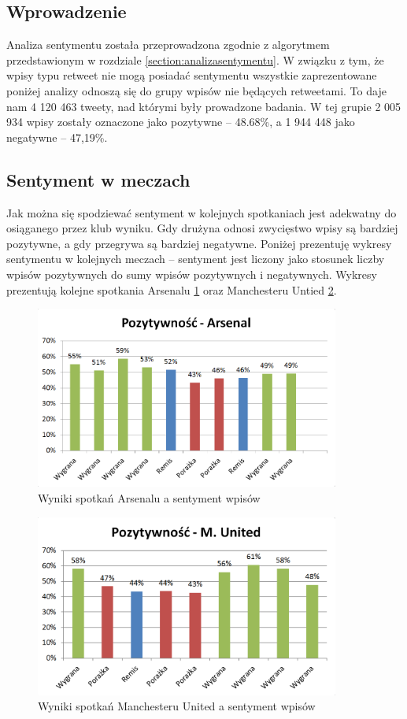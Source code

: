 \subsection{Wprowadzenie}
Analiza sentymentu została przeprowadzona zgodnie z algorytmem przedstawionym w
rozdziale \ref{section:analizasentymentu}. W związku z tym, że wpisy typu
retweet nie mogą posiadać sentymentu wszystkie zaprezentowane poniżej analizy
odnoszą się do grupy wpisów nie będących retweetami. To daje nam 4 120 463
tweety, nad którymi były prowadzone badania. W tej grupie 2 005 934 wpisy zostały
oznaczone jako pozytywne -- 48.68\%, a 1 944 448 jako negatywne -- 47,19\%.

\subsection{Sentyment w meczach}
Jak można się spodziewać sentyment w kolejnych spotkaniach jest adekwatny do
osiąganego przez klub wyniku. Gdy drużyna odnosi zwycięstwo wpisy są bardziej
pozytywne, a gdy przegrywa są bardziej negatywne. Poniżej prezentuję wykresy
sentymentu w kolejnych meczach -- sentyment jest liczony jako stosunek liczby
wpisów pozytywnych do sumy wpisów pozytywnych i negatywnych. Wykresy prezentują
kolejne spotkania Arsenalu \ref{image:pozytywnosc-arsenal} oraz Manchesteru
Untied \ref{image:pozytywnosc-munited}.

\begin{figure}[ht!]
\centering
\includegraphics[width=100mm]{img/pozytywnosc-arsenal.png}
\caption{Wyniki spotkań Arsenalu a sentyment wpisów}
\label{image:pozytywnosc-arsenal}
\end{figure}


\begin{figure}[ht!]
\centering
\includegraphics[width=100mm]{img/pozytywnosc-munited.png}
\caption{Wyniki spotkań Manchesteru United a sentyment wpisów}
\label{image:pozytywnosc-munited}
\end{figure}

